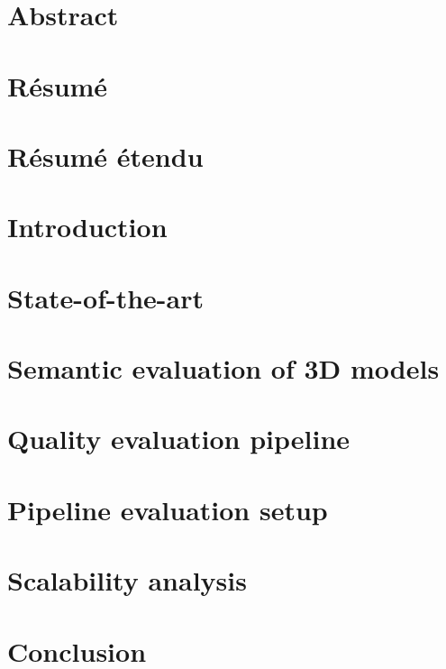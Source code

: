 \documentclass[12pt, twoside]{book}
\begin{document}
    \dominitoc
    \frontmatter
    \pagestyle{plain}
    
    
    
    \chapter{Abstract}
        
    \chapter{Résumé}
        
    \chapter{Résumé étendu}
        
    

    \tableofcontents
    \printglossary[type=\acronymtype]
    \printglossary

    \mainmatter
    \chapter{Introduction}
        
    
    \chapter{State-of-the-art}
        

    \chapter{Semantic evaluation of 3D models}
        

    \chapter{Quality evaluation pipeline}
        

    \chapter{Pipeline evaluation setup}
        

    \chapter{Scalability analysis}
        

    \chapter{Conclusion}
        

    \printindex
\end{document}
